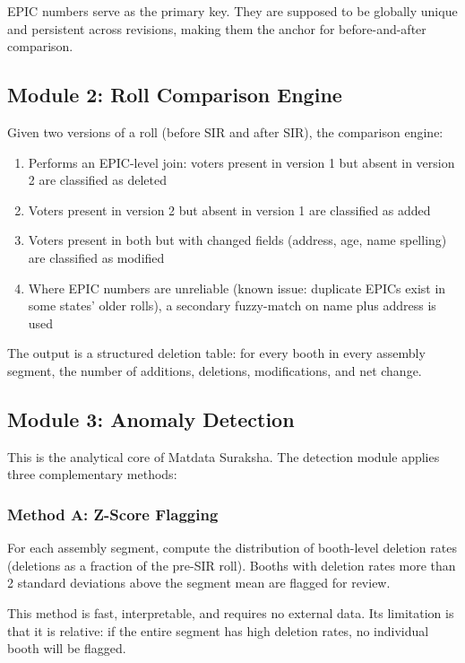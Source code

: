 \documentclass[11pt, a4paper]{article}
\begin{document}
EPIC numbers serve as the primary key. They are supposed to be globally unique and persistent across revisions, making them the anchor for before-and-after comparison.

\subsection{Module 2: Roll Comparison Engine}

Given two versions of a roll (before SIR and after SIR), the comparison engine:

\begin{enumerate}[leftmargin=1.5em, itemsep=4pt]
  \item Performs an EPIC-level join: voters present in version 1 but absent in version 2 are classified as deleted
  \item Voters present in version 2 but absent in version 1 are classified as added
  \item Voters present in both but with changed fields (address, age, name spelling) are classified as modified
  \item Where EPIC numbers are unreliable (known issue: duplicate EPICs exist in some states' older rolls), a secondary fuzzy-match on name plus address is used
\end{enumerate}

The output is a structured deletion table: for every booth in every assembly segment, the number of additions, deletions, modifications, and net change.

\subsection{Module 3: Anomaly Detection}

This is the analytical core of Matdata Suraksha. The detection module applies three complementary methods:

\subsubsection{Method A: Z-Score Flagging}

For each assembly segment, compute the distribution of booth-level deletion rates (deletions as a fraction of the pre-SIR roll). Booths with deletion rates more than 2 standard deviations above the segment mean are flagged for review.

This method is fast, interpretable, and requires no external data. Its limitation is that it is relative: if the entire segment has high deletion rates, no individual booth will be flagged.
\end{document}

